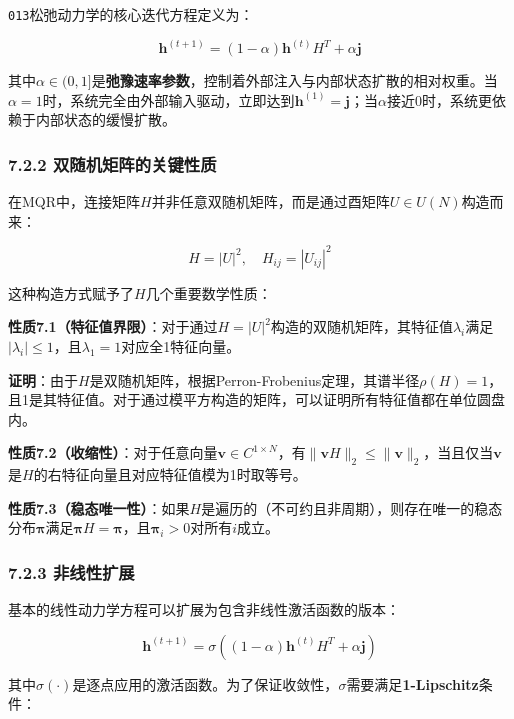 \documentclass[
  12pt,
]{article}
\begin{document}
\texttt{013}松弛动力学的核心迭代方程定义为：

\[
\textbf{h}^{(t+1)} = (1 - \alpha) \textbf{h}^{(t)} H^T + \alpha \textbf{j}
\]

其中\(\alpha \in (0, 1]\)是\textbf{弛豫速率参数}，控制着外部注入与内部状态扩散的相对权重。当\(\alpha=1\)时，系统完全由外部输入驱动，立即达到\(\textbf{h}^{(1)} = \textbf{j}\)；当\(\alpha\)接近0时，系统更依赖于内部状态的缓慢扩散。

\hypertarget{ux53ccux968fux673aux77e9ux9635ux7684ux5173ux952eux6027ux8d28}{%
\subsubsection{7.2.2
双随机矩阵的关键性质}\label{ux53ccux968fux673aux77e9ux9635ux7684ux5173ux952eux6027ux8d28}}

在MQR中，连接矩阵\(H\)并非任意双随机矩阵，而是通过酉矩阵\(U \in U(N)\)构造而来：

\[
H = |U|^2, \quad H_{ij} = |U_{ij}|^2
\]

这种构造方式赋予了\(H\)几个重要数学性质：

\textbf{性质7.1（特征值界限）}：对于通过\(H = |U|^2\)构造的双随机矩阵，其特征值\(\lambda_i\)满足\(|\lambda_i| \leq 1\)，且\(\lambda_1 = 1\)对应全1特征向量。

\textbf{证明}：由于\(H\)是双随机矩阵，根据Perron-Frobenius定理，其谱半径\(\rho(H) = 1\)，且1是其特征值。对于通过模平方构造的矩阵，可以证明所有特征值都在单位圆盘内。

\textbf{性质7.2（收缩性）}：对于任意向量\(\textbf{v} \in C^{1 \times N}\)，有\(\|\textbf{v} H\|_2 \leq \|\textbf{v}\|_2\)，当且仅当\(\textbf{v}\)是\(H\)的右特征向量且对应特征值模为1时取等号。

\textbf{性质7.3（稳态唯一性）}：如果\(H\)是遍历的（不可约且非周期），则存在唯一的稳态分布\(\boldsymbol{\pi}\)满足\(\boldsymbol{\pi} H = \boldsymbol{\pi}\)，且\(\boldsymbol{\pi}_i > 0\)对所有\(i\)成立。

\hypertarget{ux975eux7ebfux6027ux6269ux5c55}{%
\subsubsection{7.2.3 非线性扩展}\label{ux975eux7ebfux6027ux6269ux5c55}}

基本的线性动力学方程可以扩展为包含非线性激活函数的版本：

\[
\textbf{h}^{(t+1)} = \sigma\left((1 - \alpha) \textbf{h}^{(t)} H^T + \alpha \textbf{j}\right)
\]

其中\(\sigma(\cdot)\)是逐点应用的激活函数。为了保证收敛性，\(\sigma\)需要满足\textbf{1-Lipschitz}条件：
\end{document}
